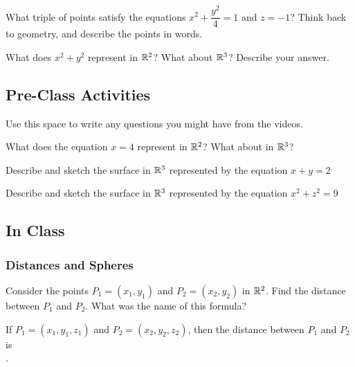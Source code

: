 \documentclass[notes]{subfiles}
\begin{document}
		\begin{ex}
			What triple of points satisfy the equations $x^2 + \dfrac{y^2}{4} = 1$ and $z = -1$?  Think back to geometry, and describe the points in words.
		\end{ex}
			
		\begin{ex}
			What does $x^2 + y^2$ represent in $\mathbb{R}^2$?  What about $\mathbb{R}^3$?  Describe your answer.
		\end{ex}
			\newpage
			
	\subsection*{Pre-Class Activities}
		\begin{ex}
			Use this space to write any questions you might have from the videos.
		\end{ex}
			
		\begin{ex}
			What does the equation $x = 4$ represent in $\mathbb{R}^2$?  What about in $\mathbb{R}^3$?
		\end{ex}
			
		\begin{ex}
			Describe and sketch the surface in $\mathbb{R}^3$ represented by the equation $x + y = 2$
		\end{ex}
			
		\begin{ex}
			Describe and sketch the surface in $\mathbb{R}^3$ represented by the equation $x^2 + z^2 = 9$
		\end{ex}
			\newpage
			
	\subsection*{In Class}
	\subsubsection*{Distances and Spheres}
		\begin{question}
			Consider the points $P_1 = (x_1,y_1)$ and $P_2 = (x_2,y_2)$ in $\mathbb{R}^2$.  Find the distance between $P_1$ and $P_2$.  What was the name of this formula?
		\end{question}
			
		\begin{rmk}
			If $P_1 = (x_1,y_1,z_1)$ and $P_2 = (x_2,y_2,z_2)$, then the distance between $P_1$ and $P_2$ is \\[15pt] .
		\end{rmk}
		
\end{document}

